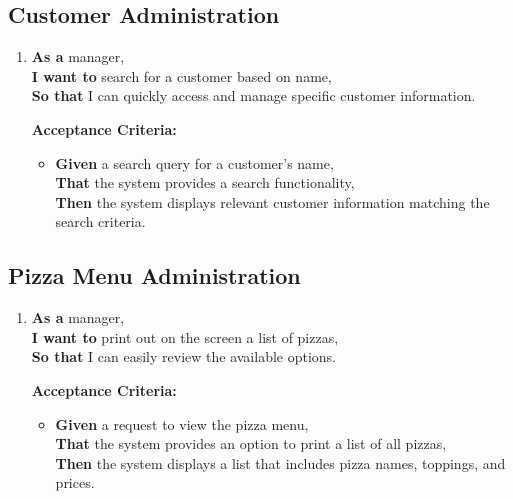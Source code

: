 \subsection{Customer Administration}

\begin{enumerate}[resume, label= \textbf{User Story \arabic*:}]
    \item \textbf{As a} manager,\\
    \textbf{I want to} search for a customer based on name,\\
    \textbf{So that} I can quickly access and manage specific customer information.
    
    \textbf{Acceptance Criteria:}
    \begin{itemize}
        \item \textbf{Given} a search query for a customer's name,\\
        \textbf{That} the system provides a search functionality,\\
        \textbf{Then} the system displays relevant customer information matching the search criteria.
    \end{itemize}
\end{enumerate}


\subsection{Pizza Menu Administration}

\begin{enumerate}[resume, label= \textbf{User Story \arabic*:}]
    \item \textbf{As a} manager,\\
    \textbf{I want to} print out on the screen a list of pizzas,\\
    \textbf{So that} I can easily review the available options.
    
    \textbf{Acceptance Criteria:}
    \begin{itemize}
        \item \textbf{Given} a request to view the pizza menu,\\
        \textbf{That} the system provides an option to print a list of all pizzas,\\
        \textbf{Then} the system displays a list that includes pizza names, toppings, and prices.
    \end{itemize}
\end{enumerate}

